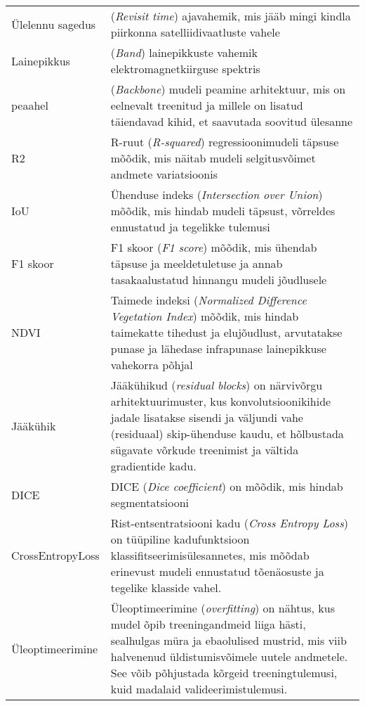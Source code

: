 \begin{longtable}{p{3cm}p{10cm}}  %
Ülelennu sagedus & (\textit{Revisit time}) ajavahemik, mis jääb mingi kindla
piirkonna satelliidivaatluste vahele\\
Lainepikkus & (\textit{Band}) lainepikkuste vahemik elektromagnetkiirguse spektris \\
peaahel & (\textit{Backbone}) mudeli peamine arhitektuur, mis on eelnevalt treenitud
ja millele on lisatud täiendavad kihid, et saavutada soovitud ülesanne\\
R2 & R-ruut (\textit{R-squared}) regressioonimudeli täpsuse mõõdik, mis näitab
mudeli selgitusvõimet andmete variatsioonis\\
IoU & Ühenduse indeks (\textit{Intersection over Union}) mõõdik, mis hindab
mudeli täpsust, võrreldes ennustatud ja tegelikke tulemusi\\
F1 skoor & F1 skoor (\textit{F1 score}) mõõdik, mis ühendab täpsuse ja
meeldetuletuse ja annab tasakaalustatud hinnangu mudeli jõudlusele\\
NDVI & Taimede indeksi (\textit{Normalized Difference Vegetation Index}) mõõdik, mis
hindab taimekatte tihedust ja elujõudlust, arvutatakse punase ja lähedase
infrapunase lainepikkuse vahekorra põhjal\\
Jääkühik & Jääkühikud (\textit{residual blocks}) on närvivõrgu arhitektuurimuster, kus konvolutsioonikihide jadale lisatakse sisendi ja väljundi vahe (residuaal) skip-ühenduse kaudu, et hõlbustada sügavate võrkude treenimist ja vältida gradientide kadu. \\
DICE & DICE (\textit{Dice coefficient}) on mõõdik, mis hindab segmentatsiooni \\
CrossEntropyLoss & Rist-entsentratsiooni kadu (\textit{Cross Entropy Loss}) on
tüüpiline kadufunktsioon klassifitseerimisülesannetes, mis mõõdab erinevust mudeli ennustatud tõenäosuste ja tegelike klasside vahel. \\
Üleoptimeerimine & Üleoptimeerimine (\textit{overfitting})  on nähtus, kus mudel õpib treeningandmeid liiga hästi, sealhulgas müra ja ebaolulised mustrid, mis viib halvenenud üldistumisvõimele uutele andmetele. See võib põhjustada kõrgeid treeningtulemusi, kuid madalaid valideerimistulemusi. \\
\end{longtable}
\addtocounter{table}{-1} %
